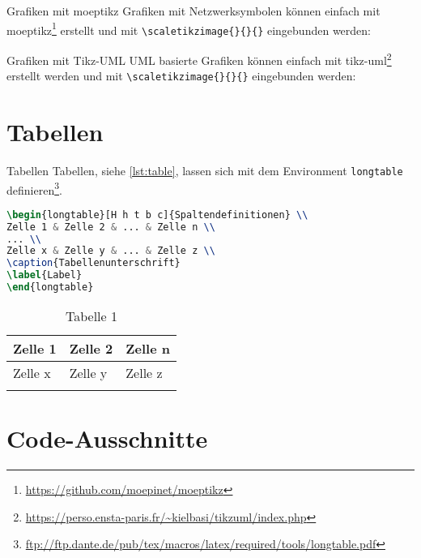 \documentclass[10pt,aspectratio=\ratio,
compress
]{beamer}
\begin{document}
\begin{frame}[containsverbatim]{Grafiken mit moeptikz}
Grafiken mit Netzwerksymbolen können einfach mit moeptikz\footnote{\url{https://github.com/moepinet/moeptikz}} erstellt und mit \lstinline|\scaletikzimage{}{}{}| eingebunden werden:
\end{frame}

\begin{frame}[containsverbatim]{Grafiken mit Tikz-UML}
UML basierte Grafiken können einfach mit tikz-uml\footnote{\url{https://perso.ensta-paris.fr/~kielbasi/tikzuml/index.php}} erstellt werden und mit \lstinline|\scaletikzimage{}{}{}| eingebunden werden:
\end{frame}


\section{Tabellen}
\begin{frame}[containsverbatim]{Tabellen}
Tabellen, siehe \autoref{lst:table}, lassen sich mit dem Environment \lstinline|longtable| definieren\footnote{\url{ftp://ftp.dante.de/pub/tex/macros/latex/required/tools/longtable.pdf}}.

\begin{lstlisting}[caption=Tabelle, language=TeX, label=lst:table]
\begin{longtable}[H h t b c]{Spaltendefinitionen} \\
Zelle 1 & Zelle 2 & ... & Zelle n \\
... \\
Zelle x & Zelle y & ... & Zelle z \\
\caption{Tabellenunterschrift}
\label{Label}
\end{longtable}
\end{lstlisting}

\begin{longtable}[H]{|p{}|p{}|p{}|}
\hline
Zelle 1 & Zelle 2 & Zelle n \\
\hline
Zelle x & Zelle y & Zelle z \\
\hline
\caption{Tabelle 1}
\label{tab:tab1}
\end{longtable}
\end{frame}

\section{Code-Ausschnitte}
\end{document}
